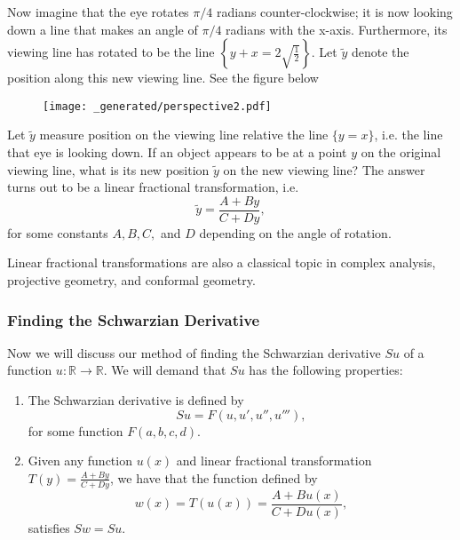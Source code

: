 Now imagine that the eye rotates \(\pi/4\) radians counter-clockwise; it is now looking down a line that makes
an angle of \(\pi/4\) radians with the x-axis. Furthermore, its viewing line has rotated to be the 
line \(\left\{y + x = 2\sqrt{\frac{1}{2}} \right\}\). Let \(\tilde y\) denote the position along this 
new viewing line. See the figure below

\begin{figure}[h]
\centering
\texttt{[image: \_generated/perspective2.pdf]}
\end{figure}

Let \(\tilde y\) measure position on the viewing line relative the line \(\{y = x\}\), i.e. the line that eye is
looking down. If an object appears to be at a point \(y\) on the original viewing line, what is its new position \(\tilde y\) on 
the new viewing line?
The answer turns out to be a linear fractional transformation, i.e.
\begin{equation}
\tilde y = \frac{A + By}{C + Dy},
\end{equation} 
for some constants \(A, B, C,\) and \(D\) depending on the angle of rotation.

Linear fractional transformations are also a classical topic in complex analysis, projective geometry, and
conformal geometry.

\subsubsection*{Finding the Schwarzian Derivative}

Now we will discuss our method of finding the Schwarzian derivative \(Su\) of a function \(u: \mathbb R \to 
\mathbb R\). We will demand that \(Su\) has the following properties:

\begin{enumerate}
\item The Schwarzian derivative is defined by
\begin{equation}
Su = F(u, u', u'', u'''),
\end{equation}
for some function \(F(a, b, c, d)\).

\item Given any function \(u(x)\) and linear fractional transformation \(T(y) = \frac{A + By}{C + Dy}\), we have
that the function defined by
\begin{equation}
w(x) = T(u(x)) = \frac{A + Bu(x)} {C + Du(x)},
\end{equation}
satisfies \(Sw = Su\).
\end{enumerate}

